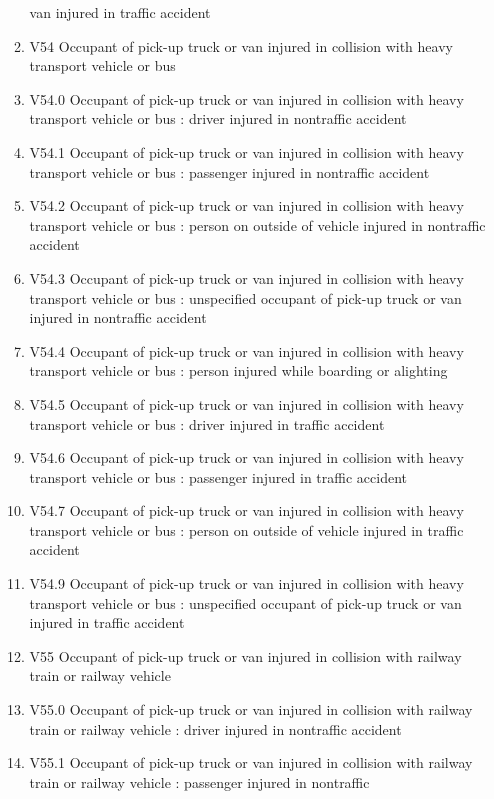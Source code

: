 \documentclass[
]{scrartcl}
\begin{document}
\begin{itemize}
\begin{enumerate}
    van injured in traffic accident
  \item
    V54 Occupant of pick-up truck or van injured in collision with heavy
    transport vehicle or bus
  \item
    V54.0 Occupant of pick-up truck or van injured in collision with
    heavy transport vehicle or bus : driver injured in nontraffic
    accident
  \item
    V54.1 Occupant of pick-up truck or van injured in collision with
    heavy transport vehicle or bus : passenger injured in nontraffic
    accident
  \item
    V54.2 Occupant of pick-up truck or van injured in collision with
    heavy transport vehicle or bus : person on outside of vehicle
    injured in nontraffic accident
  \item
    V54.3 Occupant of pick-up truck or van injured in collision with
    heavy transport vehicle or bus : unspecified occupant of pick-up
    truck or van injured in nontraffic accident
  \item
    V54.4 Occupant of pick-up truck or van injured in collision with
    heavy transport vehicle or bus : person injured while boarding or
    alighting
  \item
    V54.5 Occupant of pick-up truck or van injured in collision with
    heavy transport vehicle or bus : driver injured in traffic accident
  \item
    V54.6 Occupant of pick-up truck or van injured in collision with
    heavy transport vehicle or bus : passenger injured in traffic
    accident
  \item
    V54.7 Occupant of pick-up truck or van injured in collision with
    heavy transport vehicle or bus : person on outside of vehicle
    injured in traffic accident
  \item
    V54.9 Occupant of pick-up truck or van injured in collision with
    heavy transport vehicle or bus : unspecified occupant of pick-up
    truck or van injured in traffic accident
  \item
    V55 Occupant of pick-up truck or van injured in collision with
    railway train or railway vehicle
  \item
    V55.0 Occupant of pick-up truck or van injured in collision with
    railway train or railway vehicle : driver injured in nontraffic
    accident
  \item
    V55.1 Occupant of pick-up truck or van injured in collision with
    railway train or railway vehicle : passenger injured in nontraffic

\end{enumerate}
\end{itemize}
\end{document}
